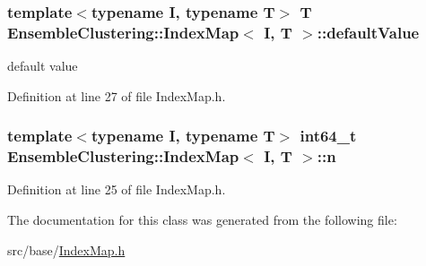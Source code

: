 \hypertarget{class_ensemble_clustering_1_1_index_map_ab5f1dc778237131e9d6c5713c2b318ec}{
\subsubsection[{default\-Value}]{\setlength{\rightskip}{0pt plus 5cm}template$<$typename I, typename T$>$ T {\bf Ensemble\-Clustering\-::\-Index\-Map}$<$ I, T $>$\-::default\-Value\hspace{0.3cm}{\ttfamily [protected]}}}\label{class_ensemble_clustering_1_1_index_map_ab5f1dc778237131e9d6c5713c2b318ec}


default value 



Definition at line 27 of file Index\-Map.\-h.

\hypertarget{class_ensemble_clustering_1_1_index_map_a3151d302c54e6ad0175bd87aef62d4ca}{
\subsubsection[{n}]{\setlength{\rightskip}{0pt plus 5cm}template$<$typename I, typename T$>$ int64\-\_\-t {\bf Ensemble\-Clustering\-::\-Index\-Map}$<$ I, T $>$\-::n\hspace{0.3cm}{\ttfamily [protected]}}}\label{class_ensemble_clustering_1_1_index_map_a3151d302c54e6ad0175bd87aef62d4ca}


Definition at line 25 of file Index\-Map.\-h.



The documentation for this class was generated from the following file\-:\begin{DoxyCompactItemize}
\item 
src/base/\hyperlink{_index_map_8h}{Index\-Map.\-h}\end{DoxyCompactItemize}
